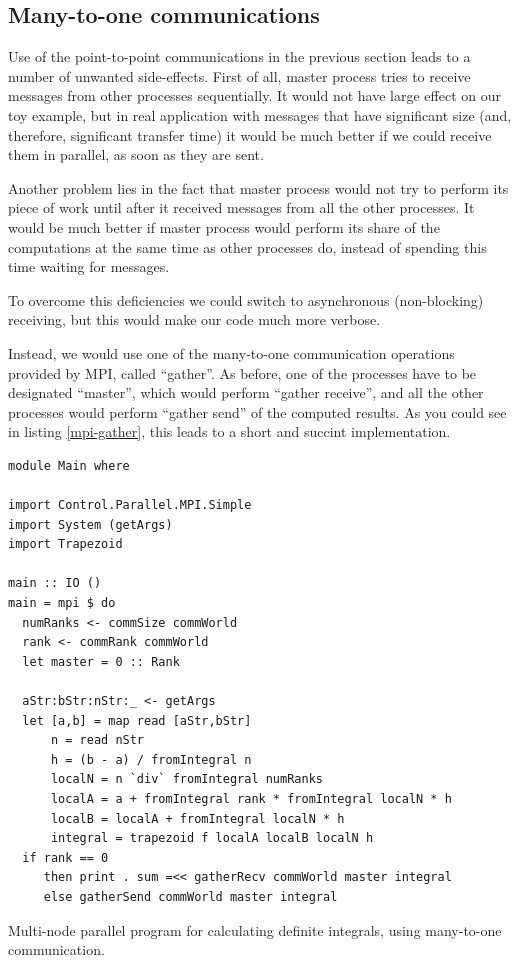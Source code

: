 \documentclass{tmr}
\begin{document}
\subsection{Many-to-one communications}

Use of the point-to-point communications in the previous section leads
to a number of unwanted side-effects. First of all, master process
tries to receive messages from other processes sequentially. It would
not have large effect on our toy example, but in real application with
messages that have significant size (and, therefore, significant
transfer time) it would be much better if we could receive them in
parallel, as soon as they are sent. 

Another problem lies in the fact that master process would not try to
perform its piece of work until after it received messages from all
the other processes. It would be much better if master process would
perform its share of the computations at the same time as other
processes do, instead of spending this time waiting for messages.

To overcome this deficiencies we could switch to asynchronous
(non-blocking) receiving, but this would make our code much more
verbose.

Instead, we would use one of the many-to-one communication operations
provided by MPI, called ``gather''. As before, one of the processes
have to be designated ``master'', which would perform ``gather
receive'', and all the other processes would perform ``gather send''
of the computed results. As you could see in listing \ref{mpi-gather},
this leads to a short and succint implementation.

\begin{listing}
\begin{Verbatim}
module Main where

import Control.Parallel.MPI.Simple
import System (getArgs)
import Trapezoid

main :: IO ()
main = mpi $ do
  numRanks <- commSize commWorld
  rank <- commRank commWorld
  let master = 0 :: Rank
  
  aStr:bStr:nStr:_ <- getArgs
  let [a,b] = map read [aStr,bStr]
      n = read nStr
      h = (b - a) / fromIntegral n
      localN = n `div` fromIntegral numRanks
      localA = a + fromIntegral rank * fromIntegral localN * h
      localB = localA + fromIntegral localN * h
      integral = trapezoid f localA localB localN h
  if rank == 0
     then print . sum =<< gatherRecv commWorld master integral
     else gatherSend commWorld master integral
\end{Verbatim}
\caption{Multi-node parallel program for calculating definite
  integrals, using many-to-one communication. \label{mpi-gather}}
\end{listing}
\end{document}
